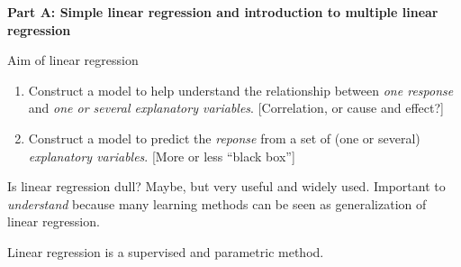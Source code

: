 \documentclass[ignorenonframetext,]{beamer}
\begin{document}
\begin{frame}

\large

\textbf{Part A: Simple linear regression and introduction to multiple
linear regression}

\normalsize

\begin{block}{Aim of linear regression}

\begin{enumerate}
\def\labelenumi{\arabic{enumi}.}
\item
  Construct a model to help understand the relationship between
  \emph{one response} and \emph{one or several explanatory variables}.
  {[}Correlation, or cause and effect?{]}
\item
  Construct a model to predict the \emph{reponse} from a set of (one or
  several) \emph{explanatory variables}. {[}More or less ``black
  box''{]}
\end{enumerate}

Is linear regression dull? Maybe, but very useful and widely used.
Important to \emph{understand} because many learning methods can be seen
as generalization of linear regression.

Linear regression is a supervised and parametric method.

\end{block}

\end{frame}
\end{document}

